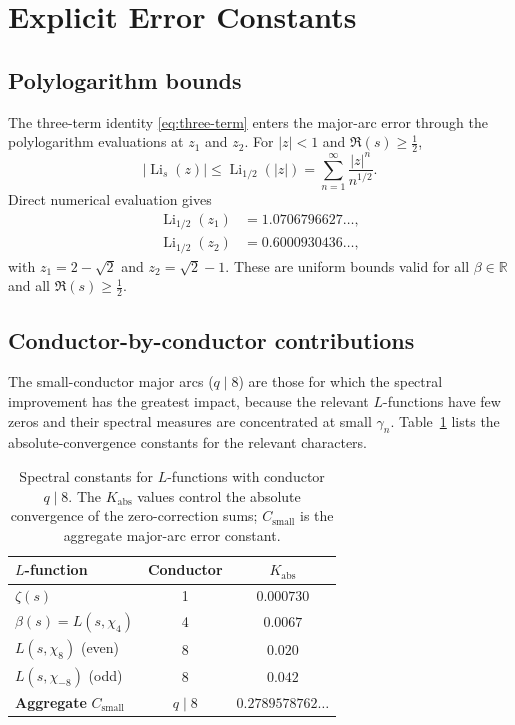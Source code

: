 \documentclass[11pt,a4paper]{article}
\theoremstyle{plain}
\theoremstyle{definition}
\theoremstyle{remark}
\numberwithin{equation}{section}
\numberwithin{table}{section}
\DeclareMathOperator{\Li}{Li}
\newcommand{\R}{\mathbb{R}}
\begin{document}
\section{Explicit Error Constants}
\label{sec:constants}

\subsection{Polylogarithm bounds}

The three-term identity \eqref{eq:three-term} enters the major-arc error
through the polylogarithm evaluations at $z_1$ and $z_2$.  For
$|z|<1$ and $\Re(s)\ge\tfrac12$,
\begin{equation}
  |\Li_s(z)| \le \Li_{1/2}(|z|)
  = \sum_{n=1}^\infty \frac{|z|^n}{n^{1/2}}.
\end{equation}
Direct numerical evaluation gives
\begin{align}
  \Li_{1/2}(z_1) &= 1.0706796627\ldots,\\
  \Li_{1/2}(z_2) &= 0.6000930436\ldots,
\end{align}
with $z_1=2-\sqrt{2}$ and $z_2=\sqrt{2}-1$.  These are uniform bounds
valid for all $\beta\in\R$ and all $\Re(s)\ge\tfrac12$.

\subsection{Conductor-by-conductor contributions}

The small-conductor major arcs ($q\mid 8$) are those for which the
spectral improvement has the greatest impact, because the relevant
$L$-functions have few zeros and their spectral measures are
concentrated at small $\gamma_n$.  Table~\ref{tab:Kabs} lists the
absolute-convergence constants for the relevant characters.

\begin{table}[htbp]
\centering
\caption{Spectral constants for $L$-functions with conductor $q\mid 8$.
The $K_{\mathrm{abs}}$ values control the absolute convergence of the
zero-correction sums; $C_{\mathrm{small}}$ is the aggregate major-arc
error constant.}
\label{tab:Kabs}
\begin{tabular}{lcc}
\toprule
\textbf{$L$-function} & \textbf{Conductor} & \textbf{$K_{\mathrm{abs}}$} \\
\midrule
$\zeta(s)$                    & 1 & $0.000730$ \\
$\beta(s)=L(s,\chi_4)$        & 4 & $0.0067$   \\
$L(s,\chi_8)$ (even)          & 8 & $0.020$    \\
$L(s,\chi_{-8})$ (odd)        & 8 & $0.042$    \\
\midrule
\textbf{Aggregate} $C_{\mathrm{small}}$ & $q\mid 8$ &
  $\mathbf{0.2789578762\ldots}$ \\
\bottomrule
\end{tabular}
\end{table}
\end{document}
